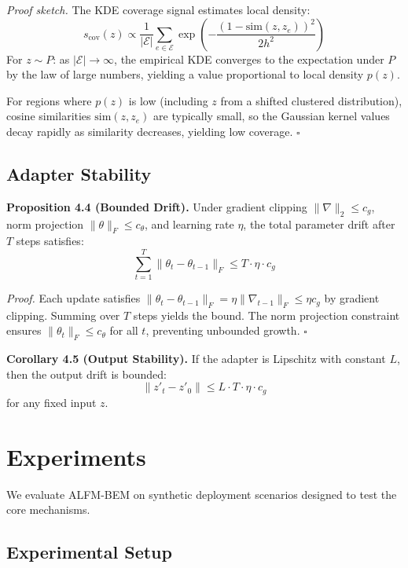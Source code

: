 \documentclass[twoside,11pt]{article}
\newcommand{\qed}{\hfill\ensuremath{\square}}
\begin{document}
\textit{Proof sketch.} The KDE coverage signal estimates local density:
\begin{equation}
    s_{\text{cov}}(z) \propto \frac{1}{|\mathcal{E}|} \sum_{e \in \mathcal{E}} \exp\left(-\frac{(1 - \text{sim}(z, z_e))^2}{2h^2}\right)
\end{equation}
For $z \sim P$: as $|\mathcal{E}| \to \infty$, the empirical KDE converges to the expectation under $P$ by the law of large numbers, yielding a value proportional to local density $p(z)$.

For regions where $p(z)$ is low (including $z$ from a shifted clustered distribution), cosine similarities $\text{sim}(z, z_e)$ are typically small, so the Gaussian kernel values decay rapidly as similarity decreases, yielding low coverage. \qed

\subsection{Adapter Stability}

\textbf{Proposition 4.4 (Bounded Drift).} Under gradient clipping $\|\nabla\|_2 \leq c_g$, norm projection $\|\theta\|_F \leq c_\theta$, and learning rate $\eta$, the total parameter drift after $T$ steps satisfies:
\begin{equation}
    \sum_{t=1}^T \|\theta_t - \theta_{t-1}\|_F \leq T \cdot \eta \cdot c_g
\end{equation}

\textit{Proof.} Each update satisfies $\|\theta_t - \theta_{t-1}\|_F = \eta \|\nabla_{t-1}\|_F \leq \eta c_g$ by gradient clipping. Summing over $T$ steps yields the bound. The norm projection constraint ensures $\|\theta_t\|_F \leq c_\theta$ for all $t$, preventing unbounded growth. \qed

\textbf{Corollary 4.5 (Output Stability).} If the adapter is Lipschitz with constant $L$, then the output drift is bounded:
\begin{equation}
    \|z'_t - z'_0\| \leq L \cdot T \cdot \eta \cdot c_g
\end{equation}
for any fixed input $z$.

\section{Experiments}
\label{sec:experiments}

We evaluate ALFM-BEM on synthetic deployment scenarios designed to test the core mechanisms.

\subsection{Experimental Setup}
\end{document}
